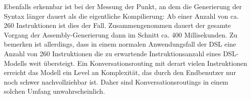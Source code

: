 \newline
Ebenfalls erkennbar ist bei der Messung der Punkt, an dem die Generierung der Syntax länger dauert als die eigentliche Kompilierung: Ab einer Anzahl von ca. 260 Instruktionen ist dies der Fall.  Zusammengenommen dauert der gesamte Vorgang der Assembly-Generierung dann im Schnitt ca. 400 Millisekunden. Zu bemerken ist allerdings, dass in einem normalen Anwendungsfall der DSL eine Anzahl von 260 Instruktionen die zu erwartende Instruktionsanzahl eines DSL-Modells weit übersteigt. Ein Konversationsrouting mit derart vielen Instruktionen erreicht das Modell ein Level an Komplexität, das durch den Endbenutzer nur noch schwer nachvollziehbar ist. Daher sind Konversationsroutings in einem solchen Umfang unwahrscheinlich.  

